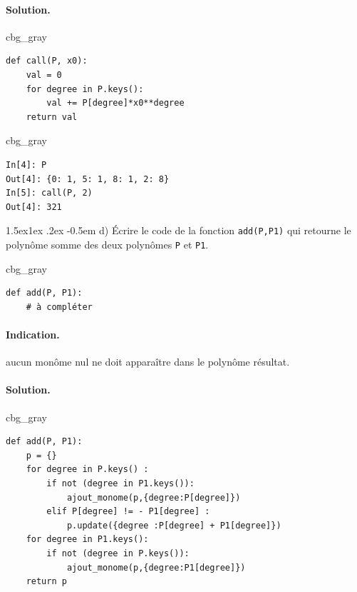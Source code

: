 \documentclass[%
oneside,                 %
final,                   %
10pt,french]{article}
\makeatletter
\newenvironment{_cod_tight}[1]{
   \def\FrameCommand{\colorbox{#1}}
   \FrameRule0.6pt\MakeFramed {\FrameRestore}\vskip3mm}
   {\vskip0mm\endMakeFramed}
\newenvironment{cod}[1]{
\bgroup\rmfamily
\fboxsep=0mm\relax
\begin{_cod_tight}{#1}
\list{}{\parsep=-2mm\parskip=0mm\topsep=0pt\leftmargin=2mm
\rightmargin=2\leftmargin\leftmargin=4pt\relax}
\item\relax}
{\endlist\end{_cod_tight}\egroup}
\newenvironment{doconceexercise}{}{}
\newcommand\subex{\@startsection{paragraph}{4}{\z@}%
                  {1.5ex\@plus1ex \@minus.2ex}%
                  {-0.5em}%
                  {\normalfont\normalsize\bfseries}}
\makeatother
\begin{document}
\begin{doconceexercise}
\paragraph{Solution.}
\begin{cod}{cbg_gray}\begin{verbatim}
def call(P, x0):
    val = 0
    for degree in P.keys():
        val += P[degree]*x0**degree
    return val
\end{verbatim}
\end{cod}
\noindent
\begin{cod}{cbg_gray}\begin{verbatim}
In[4]: P
Out[4]: {0: 1, 5: 1, 8: 1, 2: 8}
In[5]: call(P, 2)
Out[4]: 321
\end{verbatim}
\end{cod}
\noindent

\subex{d)}
Écrire le code de la fonction \texttt{add(P,P1)} qui retourne le polynôme somme des deux polynômes \texttt{P} et \texttt{P1}.
\begin{cod}{cbg_gray}\begin{verbatim}
def add(P, P1):
    # à compléter
\end{verbatim}
\end{cod}
\noindent


\paragraph{Indication.}
aucun monôme nul ne doit apparaître dans le polynôme résultat.



\paragraph{Solution.}
\begin{cod}{cbg_gray}\begin{verbatim}
def add(P, P1):
    p = {}
    for degree in P.keys() :
        if not (degree in P1.keys()):
            ajout_monome(p,{degree:P[degree]})
        elif P[degree] != - P1[degree] :
            p.update({degree :P[degree] + P1[degree]})
    for degree in P1.keys():
        if not (degree in P.keys()):
            ajout_monome(p,{degree:P1[degree]})
    return p
\end{verbatim}
\end{cod}
\noindent


\end{doconceexercise}
\end{document}
